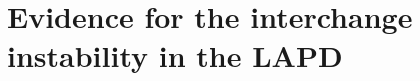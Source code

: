 \graphicspath{{../Thesis/Appendix/appendix_interchange/}}

\chapter{Evidence for the interchange instability in the LAPD}
\label{app:interchange}

